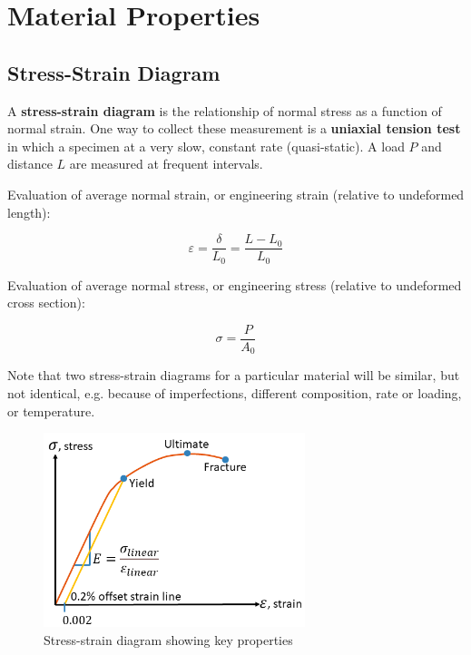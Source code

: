 \section{Material Properties }

\subsection{Stress-Strain Diagram}

A \textbf{stress-strain diagram} is the relationship of normal stress as a function of normal strain. One way to collect these measurement is a \textbf{uniaxial tension test} in which a specimen at a very slow, constant rate (quasi-static). A load $P$ and distance $L$ are measured at frequent intervals.

\vspace{5pt}

\noindent Evaluation of average normal strain, or engineering strain (relative to undeformed length):

\[\varepsilon = \frac{\delta}{L_0} = \frac{L-L_0}{L_0}\]

\noindent Evaluation of average normal stress, or engineering stress (relative to undeformed cross section):

\[\sigma = \frac{P}{A_0}\]

\noindent Note that two stress-strain diagrams for a particular material will be similar, but not identical, e.g. because of imperfections, different composition, rate or loading, or temperature.

\begin{figure}[!h]
\centering
\includegraphics[angle=0, width=3in]{Material Properties-Figures/Stress Strain Diagram.png}
\vspace{-2mm}
\caption{\small Stress-strain diagram showing key properties}
\vspace{-3mm}
\label{Fig:extensometer}
\end{figure}

